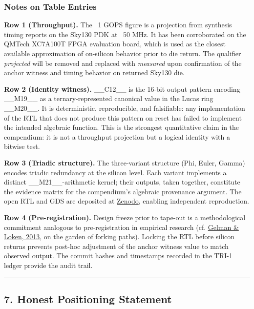 \subsubsection{Notes on Table Entries}

\textbf{Row 1 (Throughput).} The ~1 GOPS figure is a projection from synthesis timing reports on the Sky130 PDK at ~50 MHz. It has been corroborated on the QMTech XC7A100T FPGA evaluation board, which is used as the closest available approximation of on-silicon behavior prior to die return. The qualifier \textit{projected} will be removed and replaced with \textit{measured} upon confirmation of the anchor witness and timing behavior on returned Sky130 die.

\textbf{Row 2 (Identity witness).} \_\_C12\_\_ is the 16-bit output pattern encoding \_\_M19\_\_ as a ternary-represented canonical value in the Lucas ring \_\_M20\_\_. It is deterministic, reproducible, and falsifiable: any implementation of the RTL that does not produce this pattern on reset has failed to implement the intended algebraic function. This is the strongest quantitative claim in the compendium: it is not a throughput projection but a logical identity with a bitwise test.

\textbf{Row 3 (Triadic structure).} The three-variant structure (Phi, Euler, Gamma) encodes triadic redundancy at the silicon level. Each variant implements a distinct \_\_M21\_\_-arithmetic kernel; their outputs, taken together, constitute the evidence matrix for the compendium's algebraic provenance argument. The open RTL and GDS are deposited at \href{https://doi.org/10.5281/zenodo.19227877}{Zenodo}, enabling independent reproduction.

\textbf{Row 4 (Pre-registration).} Design freeze prior to tape-out is a methodological commitment analogous to pre-registration in empirical research (cf. \href{https://sites.stat.columbia.edu/gelman/research/unpublished/forking.pdf}{Gelman \& Loken, 2013}, on the garden of forking paths). Locking the RTL before silicon returns prevents post-hoc adjustment of the anchor witness value to match observed output. The commit hashes and timestamps recorded in the TRI-1 ledger provide the audit trail.

\noindent\rule{\textwidth}{0.4pt}

\subsection{7. Honest Positioning Statement}

